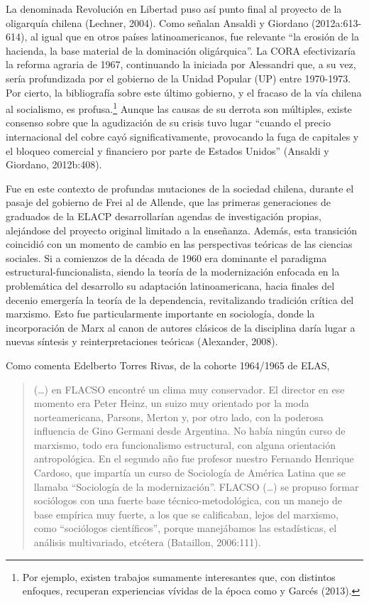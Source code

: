 La denominada Revolución en Libertad puso así punto final al proyecto de la oligarquía chilena (Lechner, 2004). Como señalan Ansaldi y Giordano (2012a:613-614), al igual que en otros países latinoamericanos, fue relevante \enquote{la erosión de la hacienda, la base material de la dominación oligárquica}. La CORA efectivizaría la reforma agraria de 1967, continuando la iniciada por Alessandri que, a su vez, sería profundizada por el gobierno de la Unidad Popular (UP) entre 1970-1973. Por cierto, la bibliografía sobre este último gobierno, y el fracaso de la vía chilena al socialismo, es profusa.\footnote{Por ejemplo, existen trabajos sumamente interesantes que, con distintos enfoques, recuperan experiencias vívidas de la época como \textcite{1503-TOURAINE1974} y Garcés (2013).} Aunque las causas de su derrota son múltiples, existe consenso sobre que la agudización de su crisis tuvo lugar ``cuando el precio internacional del cobre cayó significativamente, provocando la fuga de capitales y el bloqueo comercial y financiero por parte de Estados Unidos'' (Ansaldi y Giordano, 2012b:408).

Fue en este contexto de profundas mutaciones de la sociedad chilena, durante el pasaje del gobierno de Frei al de Allende, que las primeras generaciones de graduados de la ELACP desarrollarían agendas de investigación propias, alejándose del proyecto original limitado a la enseñanza. Además, esta transición coincidió con un momento de cambio en las perspectivas teóricas de las ciencias sociales. Si a comienzos de la década de 1960 era dominante el paradigma estructural-funcionalista, siendo la teoría de la modernización enfocada en la problemática del desarrollo su adaptación latinoamericana, hacia finales del decenio emergería la teoría de la dependencia, revitalizando tradición crítica del marxismo. Esto fue particularmente importante en sociología, donde la incorporación de Marx al canon de autores clásicos de la disciplina daría lugar a nuevas síntesis y reinterpretaciones teóricas (Alexander, 2008).

Como comenta Edelberto Torres Rivas, de la cohorte 1964/1965 de ELAS,

\begin{quote}
(\dots) en FLACSO encontré un clima muy conservador. El director en ese momento era Peter Heinz, un suizo muy orientado por la moda norteamericana, Parsons, Merton y, por otro lado, con la poderosa influencia de Gino Germani desde Argentina. No había ningún curso de marxismo, todo era funcionalismo estructural, con alguna orientación antropológica. En el segundo año fue profesor nuestro Fernando Henrique Cardoso, que impartía un curso de Sociología de América Latina que se llamaba ``Sociología de la modernización''. FLACSO (\dots) se propuso formar sociólogos con una fuerte base técnico-metodológica, con un manejo de base empírica muy fuerte, a los que se calificaban, lejos del marxismo, como ``sociólogos científicos'', porque manejábamos las estadísticas, el análisis multivariado, etcétera (Bataillon, 2006:111).
\end{quote}

